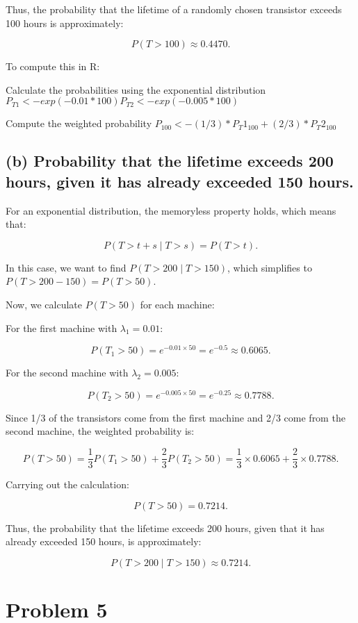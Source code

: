 \documentclass{article} %
\begin{document}
Thus, the probability that the lifetime of a randomly chosen transistor exceeds 100 hours is approximately:

\[
P(T > 100) \approx 0.4470.
\]


To compute this in R:

Calculate the probabilities using the exponential distribution
\newline
$P_{T1} <- exp(-0.01 * 100)
P_{T2} <- exp(-0.005 * 100)$

Compute the weighted probability
$P_100 <- (1/3) * P_T1_100 + (2/3) * P_T2_100$

\subsection*{(b) Probability that the lifetime exceeds 200 hours, given it has already exceeded 150 hours.}

For an exponential distribution, the memoryless property holds, which means that:

\[
P(T > t + s \mid T > s) = P(T > t).
\]

In this case, we want to find \( P(T > 200 \mid T > 150) \), which simplifies to \( P(T > 200 - 150) = P(T > 50) \).

Now, we calculate \( P(T > 50) \) for each machine:

For the first machine with \( \lambda_1 = 0.01 \):

\[
P(T_1 > 50) = e^{-0.01 \times 50} = e^{-0.5} \approx 0.6065.
\]

For the second machine with \( \lambda_2 = 0.005 \):

\[
P(T_2 > 50) = e^{-0.005 \times 50} = e^{-0.25} \approx 0.7788.
\]

Since 1/3 of the transistors come from the first machine and 2/3 come from the second machine, the weighted probability is:

\[
P(T > 50) = \frac{1}{3} P(T_1 > 50) + \frac{2}{3} P(T_2 > 50)
= \frac{1}{3} \times 0.6065 + \frac{2}{3} \times 0.7788.
\]

Carrying out the calculation:

\[
P(T > 50) = 0.7214.
\]

Thus, the probability that the lifetime exceeds 200 hours, given that it has already exceeded 150 hours, is approximately:

\[
P(T > 200 \mid T > 150) \approx 0.7214.
\]

\section*{Problem 5}
\end{document}

